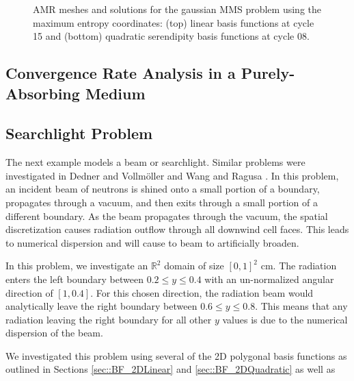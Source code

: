 \begin{figure}
{\begin{subfigure}[b]{0.485\textwidth}
		\caption{}
	\end{subfigure}
}
\caption{AMR meshes and solutions for the gaussian MMS problem using the maximum entropy coordinates: (top) linear basis functions at cycle 15 and (bottom) quadratic serendipity basis functions at cycle 08.}
\label{fig::BF_Results_MMS_GQ_AMR_MeshSol}
\end{figure}

\subsection{Convergence Rate Analysis in a Purely-Absorbing Medium}
\label{sec::BF_Results_PA}



\subsection{Searchlight Problem}
\label{sec::BF_Results_SL}

The next example models a beam or searchlight. Similar problems were investigated in Dedner and Vollm{\"o}ller \cite{dedner2002adaptive} and Wang and Ragusa \cite{wang2011standard}. In this problem, an incident beam of neutrons is shined onto a small portion of a boundary, propagates through a vacuum, and then exits through a small portion of a different boundary. As the beam propagates through the vacuum, the spatial discretization causes radiation outflow through all downwind cell faces. This leads to numerical dispersion and will cause to beam to artificially broaden.

In this problem, we investigate an $\mathbb{R}^2$ domain of size $[0,1]^2$ cm. The radiation enters the left boundary between $0.2 \leq y \leq 0.4$ with an un-normalized angular direction of $[1,0.4]$. For this chosen direction, the radiation beam would analytically leave the right boundary between $0.6 \leq y \leq 0.8$. This means that any radiation leaving the right boundary for all other $y$ values is due to the numerical dispersion of the beam.

We investigated this problem using several of the 2D polygonal basis functions as outlined in Sections \ref{sec::BF_2DLinear} and \ref{sec::BF_2DQuadratic} as well as 

